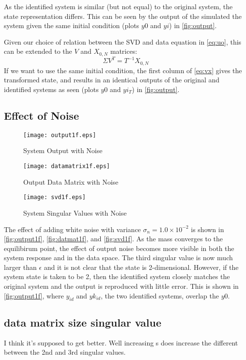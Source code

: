 \documentclass[11pt,a4paper]{article}
\begin{document}
As the identified system is similar (but not equal) to the original system, the
state representation differs. This can be seen by the output of the simulated
the system given the same initial condition (plots $y0$ and $yi$) in
\autoref{fig:output}.

Given our choice of relation between the SVD and data equation in
\autoref{eq:uo}, this can be extended to the $V$ and $X_{0, N}$ matrices:
\begin{equation}
    \label{eq:vx}
    \Sigma V^T = T^{-1} X_{0, N}
\end{equation}
If we want to use the same initial condition, the first column of
\autoref{eq:vx} gives the transformed state, and results in an identical
outputs of the original and identified systems as seen (plots $y0$ and $yi_T$)
in \autoref{fig:output}.

\subsection{Effect of Noise}
\begin{figure}
    \centering
    \texttt{[image: output1f.eps]}
    \caption{System Output with Noise}
    \label{fig:output1f}
\end{figure}
\begin{figure}
    \centering
    \texttt{[image: datamatrix1f.eps]}
    \caption{Output Data Matrix with Noise}
    \label{fig:datmat1f}
\end{figure}
\begin{figure}
    \centering
    \texttt{[image: svd1f.eps]}
    \caption{System Singular Values with Noise}
    \label{fig:svd1f}
\end{figure}
The effect of adding white noise with variance $\sigma_n = 1.0 \times 10^{-2}$
is shown in \autoref{fig:output1f}, \autoref{fig:datmat1f}, and
\autoref{fig:svd1f}. As the mass converges to the equilibirum point, the effect
of output noise becomes more visible in both the system response and in the
data space. The third singular value is now much larger than $\epsilon$ and it
is not clear that the state is 2-dimensional. However, if the system state is
taken to be 2, then the identified system closely matches the original system
and the output is reproduced with little error. This is shown in
\autoref{fig:output1f}, where $y_{id}$ and $yk_{id}$, the two identified
systems, overlap the $y0$.

\subsection{data matrix size singular value}
I think it's supposed to get better.
Well increasing s does increase the different between the 2nd and 3rd singular
values.
\end{document}
